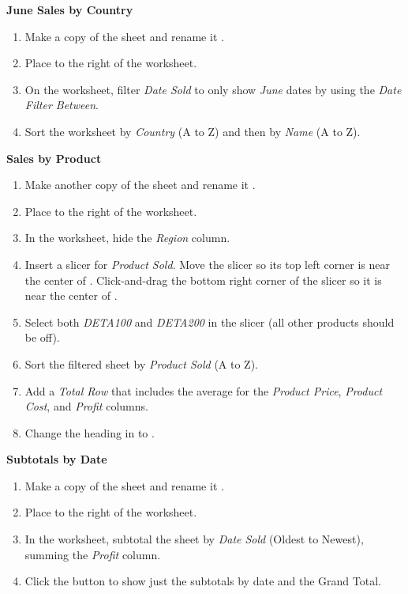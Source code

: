 \noindent
\textbf{June Sales by Country}

\begin{enumerate}[resume]
	\item Make a copy of the  sheet and rename it . 
	\item Place  to the right of the  worksheet. 
	\item On the  worksheet, filter \textit{Date Sold} to only show \textit{June} dates by using the \textit{Date Filter Between}. 
	\item Sort the worksheet by \textit{Country} (A to Z) and then by \textit{Name} (A to Z).
\end{enumerate}

\noindent
\textbf{Sales by Product}

\begin{enumerate}[resume]
	\item Make another copy of the  sheet and rename it . 
	\item Place  to the right of the  worksheet. 
	\item In the  worksheet, hide the \textit{Region} column.
	\item Insert a slicer for \textit{Product Sold}. Move the slicer so its top left corner is near the center of . Click-and-drag the bottom right corner of the slicer so it is near the center of .
	\item Select both \textit{DETA100} and \textit{DETA200} in the slicer (all other products should be off). 
	\item Sort the filtered sheet by \textit{Product Sold} (A to Z). 
	\item Add a \textit{Total Row} that includes the average for the \textit{Product Price}, \textit{Product Cost}, and \textit{Profit} columns. 
	\item Change the heading in  to .
\end{enumerate}

\noindent
\textbf{Subtotals by Date}

\begin{enumerate}[resume]
	\item Make a copy of the  sheet and rename it . 
	\item Place  to the right of the  worksheet. 
	\item In the  worksheet, subtotal the sheet by \textit{Date Sold} (Oldest to Newest), summing the \textit{Profit} column. 
	\item Click the  button to show just the subtotals by date and the Grand Total.
\end{enumerate}

